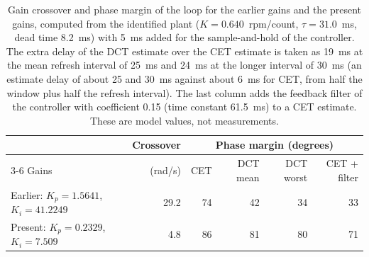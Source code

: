 \begin{table}[htbp]
    \centering
    \caption[Gain crossover and phase margin of the two sets of gains]{Gain crossover and phase margin of the loop for the earlier gains and the present gains, computed from the identified plant ($K = 0.640$~rpm/count, $\tau = 31.0$~ms, dead time 8.2~ms) with 5~ms added for the sample-and-hold of the controller. The extra delay of the DCT estimate over the CET estimate is taken as 19~ms at the mean refresh interval of 25~ms and 24~ms at the longer interval of 30~ms (an estimate delay of about 25 and 30~ms against about 6~ms for CET, from half the window plus half the refresh interval). The last column adds the feedback filter of the controller with coefficient 0.15 (time constant 61.5~ms) to a CET estimate. These are model values, not measurements.}
    \label{tab:margins}
    \small
    \begin{tabular}{@{}lrrrrr@{}}
        \toprule
        & Crossover & \multicolumn{4}{c}{Phase margin (degrees)} \\
        \cmidrule(lr){3-6}
        Gains & (rad/s) & CET & DCT mean & DCT worst & CET + filter \\
        \midrule
        Earlier: $K_p = 1.5641$, $K_i = 41.2249$ & 29.2 & 74 & 42 & 34 & 33 \\
        Present: $K_p = 0.2329$, $K_i = 7.509$ & 4.8 & 86 & 81 & 80 & 71 \\
        \bottomrule
    \end{tabular}
\end{table}

